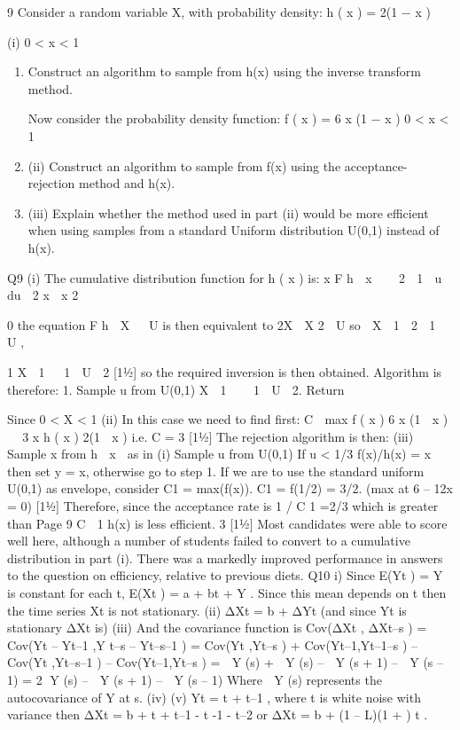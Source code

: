 \documentclass[a4paper,12pt]{article}
\begin{document}
\begin{enumerate}
9
Consider a random variable X, with probability density:
h ( x ) = 2(1 − x )

(i)
0 < x < 1

\begin{enumerate}
    \item Construct an algorithm to sample from h(x) using the inverse transform
method.

Now consider the probability density function:
f ( x ) = 6 x (1 − x ) 0 < x < 1

\item 
(ii) Construct an algorithm to sample from f(x) using the acceptance-rejection
method and h(x).

\item (iii) Explain whether the method used in part (ii) would be more efficient when
using samples from a standard Uniform distribution U(0,1) instead of h(x). 

\end{enumerate}


Q9
(i)
The cumulative distribution function for h ( x ) is:
x
F h  x    2  1  u  du  2 x  x 2

0
the equation F h  X   U is then equivalent to 2X  X 2  U
so
 X  1  2  1  U ,

1
X  1   1  U  2
[11⁄2]
so the required inversion is then obtained. Algorithm is therefore:
1. Sample u from U(0,1)
X  1    1  U 
2. Return


Since 0 < X < 1
(ii)
In this case we need to find first:
C  max
f ( x ) 6 x (1  x )

 3 x
h ( x )
2(1  x )
i.e. C = 3
[11⁄2]
The rejection algorithm is then:
(iii)
Sample x from h  x  as in (i) 
Sample u from U(0,1) 
If u < 1/3 f(x)/h(x) = x then set y = x, otherwise go to step 1. 
If we are to use the standard uniform U(0,1) as envelope, consider
C1 = max(f(x)).
C1 = f(1/2) = 3/2. (max at 6 – 12x = 0)
[11⁄2]
Therefore, since the acceptance rate is 1 / C 1 =2/3 which is greater than
Page 9 %
C 
1
h(x) is less efficient.
3
[11⁄2]
Most candidates were able to score well here, although a number of
students failed to convert to a cumulative distribution in part (i). There
was a markedly improved performance in answers to the question on
efficiency, relative to previous diets.
Q10
i)
Since E(Yt ) = \mu Y is constant for each t, E(Xt ) = a + bt + \mu Y . 
Since this mean depends on t then the time series Xt is not stationary. 
(ii) ΔXt = b + ΔYt (and since Yt is stationary ΔXt is) 
(iii) And the covariance function is Cov(ΔXt , ΔXt–s ) = Cov(Yt – Yt–1 ,Y t–s – Yt–s–1 ) 
= Cov(Yt ,Yt–s ) + Cov(Yt–1,Yt–1–s ) – Cov(Yt ,Yt–s–1 ) – Cov(Yt–1,Yt–s ) 
=  Y (s) +  Y (s) –  Y (s + 1) –  Y (s – 1) 
= 2 Y (s) –  Y (s + 1) –  Y (s – 1) 
Where  Y (s) represents the autocovariance of Y at s.
(iv)
(v)
Yt = \varepsilon t + \beta\varepsilon t–1 , where \varepsilon t is white noise with variance  then
ΔXt = b + \varepsilon t + \beta\varepsilon t–1 - \varepsilon t -1 - \beta\varepsilon t–2
or
ΔXt = b + (1 – L)(1 + \betaL) \varepsilon t .



\end{enumerate}
\end{document}
